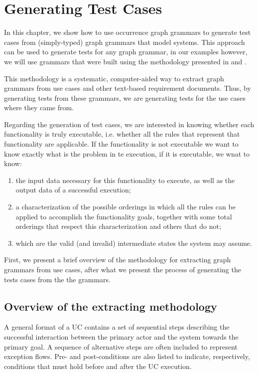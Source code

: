 \chapter{Generating Test Cases}\label{ch:tests}

In this chapter, we show how to use occurrence graph grammars to generate test cases from (simply-typed) graph grammars that model systems. This approach can be used to generate tests for any graph grammar, in our examples however, we will use grammars that were built using the methodology presented in \cite{Junior2015} and \cite{BezerraWEIT2016}.

This methodology is a systematic, computer-aided way to extract graph grammars from use cases and other text-based requirement documents. Thus, by generating tests from these grammars, we are generating tests for the use cases where they came from.

Regarding the generation of test cases, we are interested in knowing whether each functionality is truly executable, i.e. whether all the rules that represent that functionality are applicable. If the functionality is not executable we want to know exactly what is the problem in te execution, if it is executable, we wnat to know:

\begin{enumerate}
\item the input data necessary for this functionality to execute, as well as the output data of a successful execution;

\item a characterization of the possible orderings in which all the rules can be applied to accomplish the functionality goals, together with some total orderings that respect this characterization and others that do not;

\item which are the valid (and invalid) intermediate states the system may assume.
\end{enumerate}

First, we present a brief overview of the methodology for extracting graph grammars from use cases, after what we present the process of generating the tests cases from the the grammars.

\section{Overview of the extracting methodology}  A general format of a UC contains a set of sequential steps describing the successful interaction between the primary actor and the system towards the primary goal. A sequence of alternative steps are often included to represent exception flows. Pre- and post-conditions are also listed to indicate, respectively, conditions that must hold before and after the UC execution.

